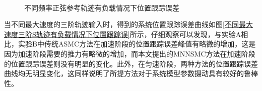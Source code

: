 \begin{figure}[H]\centering
	\\
	\caption{不同频率正弦参考轨迹有负载情况下位置跟踪误差}\label{不同频率正弦参考轨迹有负载情况下位置跟踪误差}
\end{figure}
当不同最大速度的三阶轨迹输入时，得到的系统位置跟踪误差曲线如图\ref{不同最大速度三阶S轨迹有负载情况下位置跟踪误}所示，仔细观察可以发现，与实验A相比，实验B中传统ASMC方法在加速阶段的位置跟踪误差峰值有略微的增加，这是因为加速阶段需要的推力有略微的增加，而本文提出的MNNSMC方法在加速阶段的位置跟踪误差则没有明显的变化。此外，在匀速阶段，两种方法的位置跟踪误差曲线均无明显变化，这同样说明了所提方法对于系统模型参数摄动具有较好的鲁棒性。


